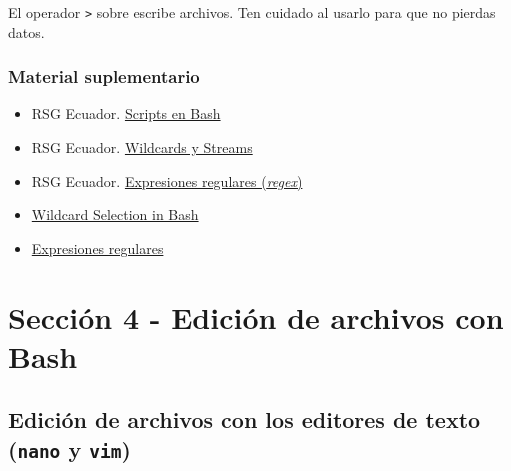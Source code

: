 \documentclass[
  spanish,
  12pt,
  letterpaper,
  DIV=11,
  numbers=noendperiod]{scrreprt}
\providecommand{\tightlist}{%
  \setlength{\itemsep}{0pt}\setlength{\parskip}{0pt}}
\begin{document}
\begin{tcolorbox}[enhanced jigsaw, arc=.35mm, bottomrule=.15mm, bottomtitle=1mm, breakable, colback=white, colbacktitle=quarto-callout-warning-color!10!white, colframe=quarto-callout-warning-color-frame, coltitle=black, left=2mm, leftrule=.75mm, opacityback=0, opacitybacktitle=0.6, rightrule=.15mm, title=\textcolor{quarto-callout-warning-color}{\faExclamationTriangle}\hspace{0.5em}{Advertencia}, titlerule=0mm, toprule=.15mm, toptitle=1mm]

El operador \texttt{\textgreater{}} sobre escribe archivos. Ten cuidado
al usarlo para que no pierdas datos.

\end{tcolorbox}

\section{Material suplementario}\label{material-suplementario-4}

\begin{itemize}
\tightlist
\item
  RSG Ecuador.
  \href{https://rsg-ecuador.github.io/unix.bioinfo.rsgecuador/content/Curso_avanzado/02_Bash/1_bash.html}{Scripts
  en Bash}
\item
  RSG Ecuador.
  \href{https://rsg-ecuador.github.io/unix.bioinfo.rsgecuador/content/Curso_basico/03_Manejo_terminal/5_wildcards.html}{Wildcards
  y Streams}
\item
  RSG Ecuador.
  \href{https://rsg-ecuador.github.io/unix.bioinfo.rsgecuador/content/Curso_basico/04_Procesamiento_ficheros_regex_pipes/3_Expresiones_regulares.html}{Expresiones
  regulares (\emph{regex})}
\item
  \href{https://pressbooks.senecapolytechnic.ca/uli101/chapter/wildcard-selection-in-bash/}{Wildcard
  Selection in Bash}
\item
  \href{https://twiki.org/cgi-bin/view/Codev/TWikiPresentation2017x06x01Regex}{Expresiones
  regulares}
\end{itemize}

\part{\textbf{Sección 4} - Edición de archivos con Bash}

\chapter{\texorpdfstring{Edición de archivos con los editores de texto
(\texttt{nano} y
\texttt{vim})}{Edición de archivos con los editores de texto (nano y vim)}}\label{ediciuxf3n-de-archivos-con-los-editores-de-texto-nano-y-vim}
\end{document}
